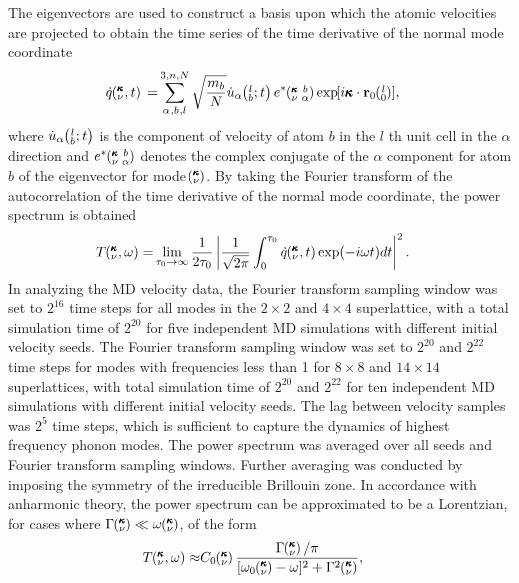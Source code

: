 \documentclass[aps,prb,preprint,preprintnumbers,amsmath,amssymb,floatfix,superscriptaddress]{revtex4}
\newcommand{\EXP}[1]{\exp\mspace{-5.0mu}\left[#1\right]\mspace{-3.0mu}}
\newcommand{\SUM}[2]{\ifthenelse{\equal{#1}{0}}{\sum_{
\alpha_{#2},b_{#2},l_{#2}}^{3,n,N}} {\ifthenelse{\equal{#1}{1}}{\sum_{
\alpha_{#2},b_{#2}}^{3,n}}{\sum_{\pmb{\kappa}#2,\nu#2}^{N,3n}}}}
\newcommand{\ab}[2]{\mspace{-4.0mu}\left(\mspace{-8.0mu}
\begin{smallmatrix}&\ifthenelse{\equal{#1}{}}{a}{#1} \\&\ifthenelse
{\equal{#2}{}}{b}{#2}\end{smallmatrix}\mspace{-3.0mu}\right)}
\newcommand{\kvba}{\mspace{-4.0mu}\left(\mspace{-8.0mu}
\begin{smallmatrix} &\pmb{\kappa} &b \\ &\nu &\alpha\end{smallmatrix}
\mspace{-3.0mu}\right)}
\newcommand{\kvt}{\mspace{-4.0mu}\left(\mspace{-8.0mu}
\begin{smallmatrix}&\pmb{\kappa} \\&\nu\end{smallmatrix}
\mspace{-2.0mu},t\right)}
\newcommand{\kvw}{\mspace{-4.0mu}\left(\mspace{-8.0mu}
\begin{smallmatrix}&\pmb{\kappa} \\&\nu\end{smallmatrix}
\mspace{-2.0mu},\omega\right)}
\newcommand{\kv}{\mspace{-4.0mu}\left(\mspace{-8.0mu}
\begin{smallmatrix}&\pmb{\kappa} \\&\nu\end{smallmatrix}
\mspace{-3.0mu}\right)}
\newcommand{\lbt}{\mspace{-4.0mu}\left(\mspace{-8.0mu}
\begin{smallmatrix}&l \\&b\end{smallmatrix}\mspace{-2.0mu};t\right)}
\begin{document}
The eigenvectors are used to construct a basis upon which the atomic velocities are projected to obtain the time series of the time derivative of the normal mode coordinate 
\begin{equation}\label{EQ:NMD:qdot}
\begin{split}
\dot{q}\kvt{}{}{}=&\SUM{0}{}\sqrt{\frac{m_b}{N}}\dot{u}_{\alpha}\lbt e^*\kvba\EXP{i\pmb{\kappa}\cdot\mathbf{r}_0\ab{l}{0}},
\end{split}
\end{equation}
where $\dot{u}_{\alpha}\lbt$ is the component of velocity of atom $b$ in the $l$ th unit cell in the $\alpha$ direction and $e^*\kvba$ denotes the complex conjugate of the $\alpha$ component for atom $b$ of the eigenvector for mode $\kv$. By taking the Fourier transform of the autocorrelation of the time derivative of the normal mode coordinate, the power spectrum is obtained \cite{dove_introduction_1993-3}
\begin{equation}\label{EQ:NMD:SED}
\begin{split}
T\kvw=&\lim_{\tau_0\rightarrow\infty}\frac{1}{2\tau_0}\left|\frac{1}{\sqrt{2\pi}}\int_{0}^{\tau_0}\dot{q}\kvt\exp(-i\omega t)dt\right|^2.
\end{split}
\end{equation}
In analyzing the MD velocity data, the Fourier transform sampling window was set to $2^{16}$ time steps for all modes in the $2\times 2$ and $4 \times 4$ superlattice, with a total simulation time of $2^{20}$ for five independent MD simulations with different initial velocity seeds. The Fourier transform sampling window was set to $2^{20}$ and $2^{22}$ time steps for modes with frequencies less than 1 for $8\times 8$ and $14 \times 14$ superlattices, with total simulation time of $2^{20}$ and $2^{22}$ for ten independent MD simulations with different initial velocity seeds. The lag between velocity samples was $2^5$ time steps, which is sufficient to capture the dynamics of highest frequency phonon modes. The power spectrum was averaged over all seeds and Fourier transform sampling windows. Further averaging was conducted by imposing the symmetry of the irreducible Brillouin zone. In accordance with anharmonic theory\cite{maradudin_scattering_1962}, the power spectrum can be approximated to be a Lorentzian, for cases where $\Gamma\kv \ll \omega\kv$, of the form 
\begin{equation}\label{EQ:NMD:LOR}
\begin{split}
T\kvw\approx&C_0\kv\frac{\Gamma\kv/\pi}{[\omega_0\kv-\omega]^2+\Gamma^2\kv},
\end{split}
\end{equation}
\end{document}
